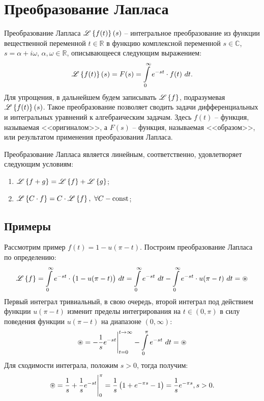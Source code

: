 \section{Преобразование Лапласа}

	Преобразование Лапласа $\mathscr{L} \left\lbrace {f(t)} \right\rbrace \left( s \right)$ -- интегральное преобразование из функции вещественной переменной $t \in \mathbb{R}$ в функцию комплексной переменной $s \in \mathbb{C}$, $s = \alpha + i \omega$, $\alpha, \omega \in \mathbb{R}$, описывающееся следующим выражением:
	\[ \mathscr{L} \left\lbrace {f(t)} \right\rbrace \left( s \right) = F(s) = \int\limits_{0}^{\infty} e^{-st} \cdot f(t) ~ dt. \]
	Для упрощения, в дальнейшем будем записывать $\mathscr{L} \left\lbrace {f} \right\rbrace$, подразумевая $\mathscr{L} \left\lbrace {f(t)} \right\rbrace \left( s \right)$. Такое преобразование позволяет сводить задачи дифференциальных и интегральных уравнений к алгебраическим задачам. Здесь $f(t)$ -- функция, называемая <<оригиналом>>, а $F(s)$ -- функция, называемая <<образом>>, или результатом применения преобразования Лапласа.

	Преобразование Лапласа является линейным, соответственно, удовлетворяет следующим условиям:
	\begin{enumerate}
		\item \( \mathscr{L} \left\lbrace {f + g} \right\rbrace = \mathscr{L} \left\lbrace {f} \right\rbrace + \mathscr{L} \left\lbrace {g} \right\rbrace \);
		\item \( \mathscr{L} \left\lbrace {C \cdot f} \right\rbrace = C \cdot \mathscr{L} \left\lbrace {f} \right\rbrace, ~ \forall C - \mathrm{const} \);
	\end{enumerate}

	\subsection{Примеры}

		Рассмотрим пример $f(t) = 1 - u(\pi-t)$. Построим преобразование Лапласа по определению:
		\[ 
			\mathscr{L} \left\lbrace {f} \right\rbrace 
				= \int\limits_{0}^{\infty} e^{-st} \cdot \bigl( 1 - u(\pi-t) \bigr) ~ dt 
				= \int\limits_{0}^{\infty} e^{-st} ~ dt - \int\limits_{0}^{\infty} e^{-st} \cdot u(\pi-t) ~ dt 
				= \circledast 
		\]
		Первый интеграл тривиальный, в свою очередь, второй интеграл под действием функции $u(\pi-t)$ изменит пределы интегрирования на $t \in (0, \pi)$ в силу поведения функции $u(\pi-t)$ на диапазоне $(0, \infty)$:
		\[ \circledast 
				= -\frac{1}{s} e^{-st} \Biggl\vert \Biggr._{t = 0}^{t \to \infty} - \int\limits_{0}^{\pi} e^{-st} ~ dt 
				= \circledast 
		\]
		Для сходимости интеграла, положим $s > 0$, тогда получим:
		\[ \circledast 
				= \frac{1}{s} + \frac{1}{s} e^{-st} \Biggl\vert \Biggr._{0}^{\pi} 
				= \frac{1}{s} \left( 1 + e^{-\pi s} - 1 \right) 
				= \frac{1}{s} e^{-\pi s}, s > 0. 
		\]

